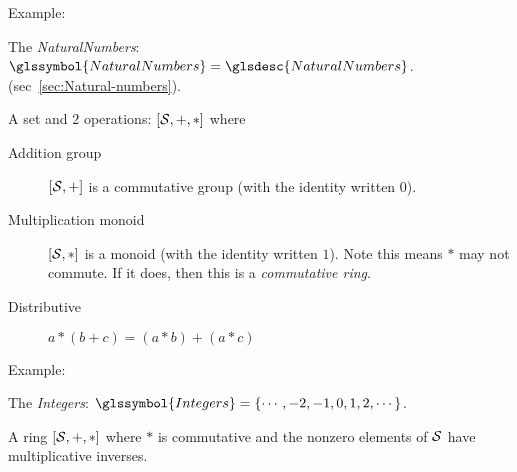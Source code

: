 Example: 

The \textit{\gls{NaturalNumbers}}: 
$\glssymbol{NaturalNumbers} = \glsdesc{NaturalNumbers}$.
(sec~\ref{sec:Natural-numbers}).

\label{sec:Ring}
\cite{wiki:Ring-mathematics}

A set and $2$ operations: $\left[ \mathcal{S}, +, * \right]$
where
\begin{description}
  \item[Addition group] $\left[ \mathcal{S}, + \right]$ 
  is a commutative group (with the identity written $0$).
  \item[Multiplication monoid] $\left[ \mathcal{S}, * \right]$ 
  is a monoid (with the identity written $1$).
  Note this means $*$ may not commute. If it does, 
  then this is a \textit{commutative ring}.
  \item[Distributive] $a * \left( b + c \right) 
  = \left( a * b \right) + \left( a * c \right)$
\end{description}

Example:

The \textit{\gls{Integers}}: 
$\glssymbol{Integers} = \{\cdots, -2, -1, 0, 1, 2, \cdots\}$.

\label{sec:Field}
\cite{wiki:Field_mathematics}

A ring $\left[ \mathcal{S}, +, * \right]$ where
$*$ is commutative and the nonzero elements of $\mathcal{S}$
have multiplicative inverses.

